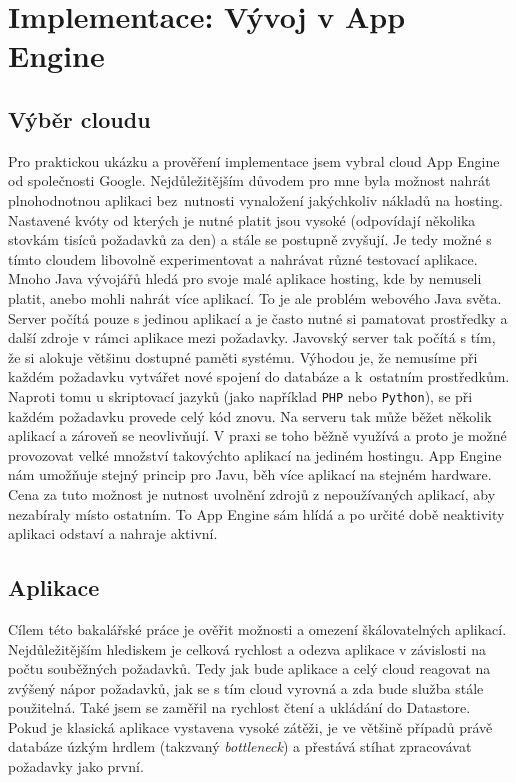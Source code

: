 \chapter{Implementace: Vývoj v App Engine}

\section{Výběr cloudu}
Pro praktickou ukázku a prověření implementace jsem vybral cloud App Engine od společnosti Google. Nejdůležitějším důvodem pro mne byla možnost nahrát plnohodnotnou aplikaci bez~nutnosti vynaložení jakýchkoliv nákladů na hosting. Nastavené kvóty od kterých je nutné platit jsou vysoké (odpovídají několika stovkám tisíců požadavků za den) a stále se postupně zvyšují. Je tedy možné s tímto cloudem libovolně experimentovat a nahrávat různé testovací aplikace. Mnoho Java vývojářů hledá pro svoje malé aplikace hosting, kde by nemuseli platit, anebo mohli nahrát více aplikací. To je ale problém webového Java světa. Server počítá pouze s jedinou aplikací a je často nutné si pamatovat prostředky a další zdroje v rámci aplikace mezi požadavky. Javovský server tak počítá s tím, že si alokuje většinu dostupné paměti systému. Výhodou je, že nemusíme při každém požadavku vytvářet nové spojení do databáze a k~ostatním prostředkům. Naproti tomu u skriptovací jazyků (jako například \verb|PHP| nebo \verb|Python|), se při každém požadavku provede celý kód znovu. Na serveru tak může běžet několik aplikací a zároveň se neovlivňují. V praxi se toho běžně využívá a proto je možné provozovat velké množství takovýchto aplikací na jediném hostingu. App Engine nám umožňuje stejný princip pro Javu, běh více aplikací na stejném hardware. Cena za tuto možnost je nutnost uvolnění zdrojů z nepoužívaných aplikací, aby nezabíraly místo ostatním. To App Engine sám hlídá a po určité době neaktivity aplikaci odstaví a nahraje aktivní.

\section{Aplikace}
Cílem této bakalářské práce je ověřit možnosti a omezení škálovatelných aplikací. Nejdůležitějším hlediskem je celková rychlost a odezva aplikace v závislosti na počtu souběžných požadavků. Tedy jak bude aplikace a celý cloud reagovat na zvýšený nápor požadavků, jak se s tím cloud vyrovná a zda bude služba stále použitelná. Také jsem se zaměřil na rychlost čtení a ukládání do Datastore. Pokud je klasická aplikace vystavena vysoké zátěži, je ve většině případů právě databáze úzkým hrdlem (takzvaný \emph{bottleneck}) a přestává stíhat zpracovávat požadavky jako první. 

